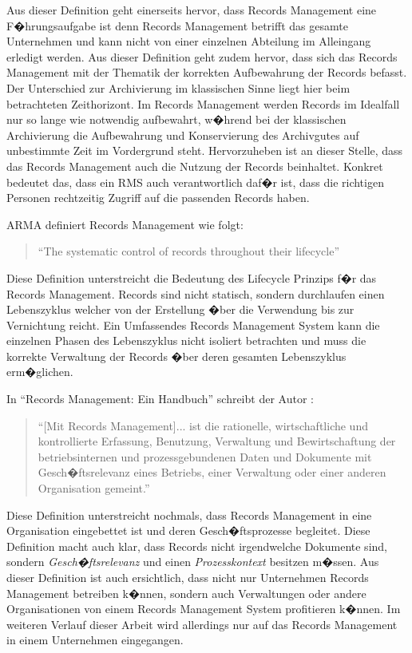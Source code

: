 \documentclass[a4paper,twoside,10pt]{report}
\begin{document}
Aus dieser Definition geht einerseits hervor, dass Records Management eine F�hrungsaufgabe ist denn Records Management betrifft das gesamte Unternehmen und kann nicht von einer einzelnen Abteilung im Alleingang erledigt werden. Aus dieser Definition geht zudem hervor, dass sich das Records Management mit der Thematik der korrekten Aufbewahrung der Records befasst. Der Unterschied zur Archivierung im klassischen Sinne liegt hier beim betrachteten Zeithorizont. Im Records Management werden Records im Idealfall nur so lange wie notwendig aufbewahrt, w�hrend bei der klassischen Archivierung die Aufbewahrung und Konservierung des Archivgutes auf unbestimmte Zeit im Vordergrund steht. Hervorzuheben ist an dieser Stelle, dass das Records Management auch die Nutzung der Records beinhaltet. Konkret bedeutet das, dass ein \ac{RMS} auch verantwortlich daf�r ist, dass die richtigen Personen rechtzeitig Zugriff auf die passenden Records haben.

\ac{ARMA} definiert Records Management wie folgt:

\begin{quotation}
"`The systematic control of records throughout their lifecycle"' \cite{defarma}
\end{quotation}

Diese Definition unterstreicht die Bedeutung des Lifecycle Prinzips f�r das Records Management. Records sind nicht statisch, sondern durchlaufen einen Lebenszyklus welcher von der Erstellung �ber die Verwendung bis zur Vernichtung reicht. Ein Umfassendes Records Management System kann die einzelnen Phasen des Lebenszyklus nicht isoliert betrachten und muss die korrekte Verwaltung der Records �ber deren gesamten Lebenszyklus erm�glichen.

In "`Records Management: Ein Handbuch"' schreibt der Autor \citeauthor{rmHandbook}: 

\begin{quotation}
"`[Mit Records Management]... ist die rationelle, wirtschaftliche und kontrollierte Erfassung, Benutzung, Verwaltung und Bewirtschaftung der betriebsinternen und prozessgebundenen Daten und Dokumente mit Gesch�ftsrelevanz eines Betriebs, einer Verwaltung oder einer anderen Organisation gemeint."' \cite{rmHandbook}
\end{quotation}

Diese Definition unterstreicht nochmals, dass Records Management in eine Organisation eingebettet ist und deren Gesch�ftsprozesse begleitet. Diese Definition macht auch klar, dass Records nicht irgendwelche Dokumente sind, sondern \emph{Gesch�ftsrelevanz} und einen \emph{Prozesskontext} besitzen m�ssen. Aus dieser Definition ist auch ersichtlich, dass nicht nur Unternehmen Records Management betreiben k�nnen, sondern auch Verwaltungen oder andere Organisationen von einem Records Management System profitieren k�nnen. Im weiteren Verlauf dieser Arbeit wird allerdings nur auf das Records Management in einem Unternehmen eingegangen.
\end{document}

